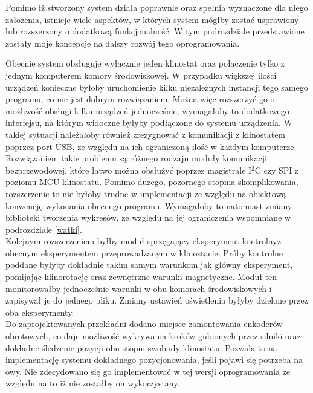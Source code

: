 Pomimo iż stworzony system działa poprawnie oraz spełnia wyznaczone dla niego założenia, istnieje wiele aspektów, w których system mógłby zostać usprawiony lub rozszerzony o dodatkową funkcjonalność. W tym podrozdziale przedstawione zostały moje koncepcje na dalszy rozwój tego oprogramowania.\newline

Obecnie system obsługuje wyłącznie jeden klinostat oraz połączenie tylko z jednym komputerem komory środowiskowej. W przypadku większej ilości urządzeń konieczne byłoby uruchomienie kilku niezależnych instancji tego samego programu, co nie jest dobrym rozwiązaniem. Można więc rozszerzyć go o możliwość obsługi kilku urządzeń jednocześnie, wymagałoby to dodatkowego interfejsu, na którym widoczne byłyby podłączone do systemu urządzenia. W takiej sytuacji należałoby również zrezygnować z komunikacji z klinostatem poprzez port USB, ze względu na ich ograniczoną ilość w każdym komputerze. Rozwiązaniem takie problemu są różnego rodzaju moduły komunikacji bezprzewodowej, które łatwo można obsłużyć poprzez magistrale I$^2$C czy SPI z poziomu MCU klinostatu. Pomimo dużego, pozornego stopnia skomplikowania, rozszerzenie to nie byłoby trudne w implementacji ze względu na obiektową konwencję wykonania obecnego programu. Wymagałoby to natomiast zmiany biblioteki tworzenia wykresów, ze względu na jej ograniczenia wspomniane w podrozdziale \ref{watki}.\\

Kolejnym rozszerzeniem byłby moduł sprzęgający eksperyment kontrolny\linebreak z obecnym eksperymentem przeprowadzanym w klinostacie. Próby kontrolne poddane byłyby dokładnie takim samym warunkom jak główny eksperyment, pomijając klinorotację oraz zewnętrzne warunki magnetyczne. Moduł ten monitorowałby jednocześnie warunki w obu komorach środowiskowych i zapisywał je do jednego pliku. Zmiany ustawień oświetlenia byłyby dzielone przez oba eksperymenty.\\

Do zaprojektowanych przekładni dodano miejsce zamontowania enkoderów obrotowych, co daje możliwość wykrywania kroków gubionych przez silniki oraz dokładne śledzenie pozycji obu stopni swobody klinostatu. Pozwala to na implementację systemu dokładnego pozycjonowania, jeśli pojawi się potrzeba na owy. Nie zdecydowano się go implementować w tej wersji oprogramowania ze względu na to iż nie zostałby on wykorzystany.\\

